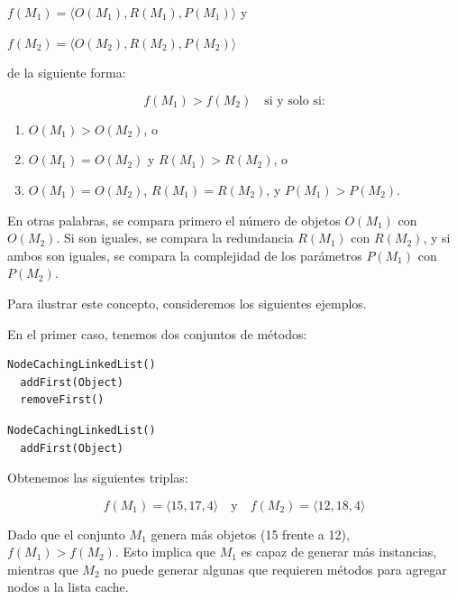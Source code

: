 \( f(M_1) = \langle O(M_1), R(M_1), P(M_1) \rangle \) y

\( f(M_2) = \langle O(M_2), R(M_2), P(M_2) \rangle \) 
\vspace{5pt} 

de la siguiente forma:

\[
f(M_1) > f(M_2) \quad \text{si y solo si:}
\]

\begin{enumerate}
    \item \( O(M_1) > O(M_2) \), o
    \item \( O(M_1) = O(M_2) \) y \( R(M_1) > R(M_2) \), o
    \item \( O(M_1) = O(M_2) \), \( R(M_1) = R(M_2) \), y \( P(M_1) > P(M_2) \).
\end{enumerate}

En otras palabras, se compara primero el número de objetos \( O(M_1) \) con \( O(M_2) \). Si son iguales, se compara la redundancia \( R(M_1) \) con \( R(M_2) \), y si ambos son iguales, se compara la complejidad de los parámetros \( P(M_1) \) con \( P(M_2) \).

Para ilustrar este concepto, consideremos los siguientes ejemplos.

En el primer caso, tenemos dos conjuntos de métodos:
\vspace{5pt} 

\begin{lstlisting}[numbers=none,label=fig:NCLbuilders1, caption=Conjunto de métodos \( M_1 \)]
  NodeCachingLinkedList()
  addFirst(Object)
  removeFirst()
\end{lstlisting} 


\begin{lstlisting}[numbers=none,label=fig:NCLbuilders2, caption=Conjunto de métodos \( M_2 \)]
  NodeCachingLinkedList()
  addFirst(Object)
\end{lstlisting}


Obtenemos las siguientes triplas:

\[
f(M_1) = \langle 15, 17, 4 \rangle \quad \text{y} \quad f(M_2) = \langle 12, 18, 4 \rangle
\]


Dado que el conjunto \( M_1 \) genera más objetos (15 frente a 12), \( f(M_1) > f(M_2) \). Esto implica que \( M_1 \) es capaz de generar más instancias, mientras que \( M_2 \) no puede generar algunas que requieren métodos para agregar nodos a la lista cache.

